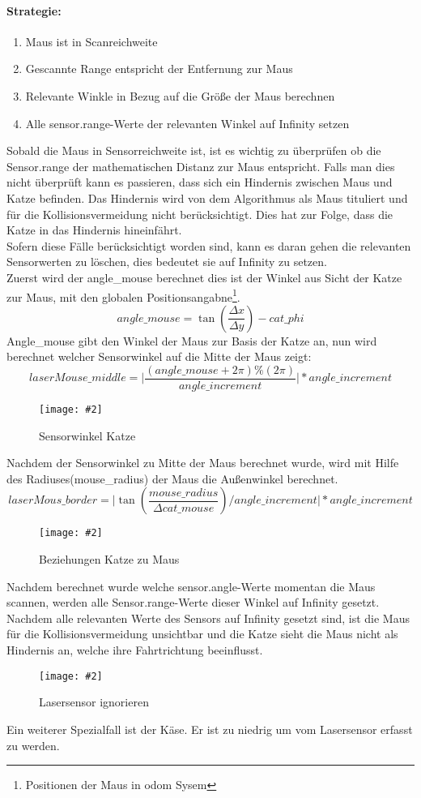 \documentclass[
a4paper,     %
12pt         %
]{scrartcl}  %
\newcommand{\mygraphics}[3]{
\begin{figure}[!h]
  \begin{center}
    \texttt{[image: \#2]} \\
    \caption{#3}\label{fig:#2}
  \end{center}
\end{figure}

}
\begin{document}
\paragraph{Strategie:}
\begin{enumerate}
\item Maus ist in Scanreichweite
\item Gescannte Range entspricht der Entfernung zur Maus
\item Relevante Winkle in Bezug auf die Größe der Maus berechnen
\item Alle sensor.range-Werte der relevanten Winkel auf Infinity setzen
\end{enumerate}
Sobald die Maus in Sensorreichweite ist, ist es wichtig zu überprüfen ob die Sensor.range der mathematischen Distanz zur Maus entspricht. Falls man dies nicht überprüft kann es passieren, dass sich ein Hindernis zwischen Maus und Katze befinden. Das Hindernis wird von dem Algorithmus als Maus tituliert und für die Kollisionsvermeidung nicht berücksichtigt. Dies hat zur Folge, dass die Katze in das Hindernis hineinfährt.\\
Sofern diese Fälle berücksichtigt worden sind, kann es daran gehen die relevanten Sensorwerten zu löschen, dies bedeutet sie auf Infinity zu setzen. \\
Zuerst wird der angle\_mouse berechnet dies ist der Winkel aus Sicht der Katze zur Maus, mit den globalen Positionsangabne\footnote{Positionen der Maus in odom Sysem}.
\[ angle\_mouse=\tan( \frac{\Delta x}{\Delta y} ) -cat\_phi \]
Angle\_mouse gibt den Winkel der Maus zur Basis der Katze an, nun wird berechnet welcher Sensorwinkel auf die Mitte der Maus zeigt:
\[ laserMouse\_middle  =  \vert \frac{ (angle\_mouse + 2  \pi) \% (2 \pi)}{angle\_increment}  \vert * angle\_increment \]
\mygraphics{0.5\textwidth}{collisionANGLE2.png}{Sensorwinkel Katze}
\noindent Nachdem der Sensorwinkel zu Mitte der Maus berechnet wurde, wird mit Hilfe des Radiuses(mouse\_radius) der Maus die Außenwinkel berechnet.
\[
laserMous\_border =  \vert { \tan( \frac{mouse\_radius}{\Delta cat\_mouse} ) } / angle\_increment \vert  * angle\_increment \]
\hspace*{0.63\textwidth}
\mygraphics{0.5\textwidth}{catmous.png}{Beziehungen Katze zu Maus}
\noindent Nachdem berechnet wurde welche sensor.angle-Werte momentan die Maus scannen, werden alle Sensor.range-Werte dieser Winkel auf Infinity gesetzt. Nachdem alle relevanten Werte des     Sensors auf Infinity gesetzt sind, ist die Maus für die Kollisionsvermeidung unsichtbar und die Katze sieht die Maus nicht als Hindernis an, welche ihre Fahrtrichtung beeinflusst.\\
\mygraphics{0.5\textwidth}{collisionMOUS.png}{Lasersensor ignorieren }
\noindent Ein weiterer Spezialfall ist der Käse. Er ist zu niedrig um vom Lasersensor erfasst zu werden.
\end{document}
